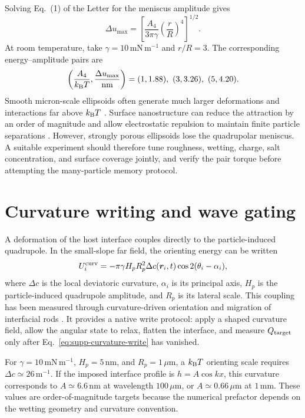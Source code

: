 \documentclass[aps,prl,onecolumn,superscriptaddress,nofootinbib]{revtex4-2}
\begin{document}
Solving Eq.~(1) of the Letter for the meniscus amplitude gives
\begin{equation}
 \Delta u_{\max}=
 \left[
 \frac{A_4}{3\pi\gamma}
 \left(\frac{r}{R}\right)^4
 \right]^{1/2}.
 \label{eq:supp-meniscus}
\end{equation}
At room temperature, take \(\gamma=10\,\mathrm{mN\,m^{-1}}\) and \(r/R=3\).
The corresponding energy--amplitude pairs are
\begin{equation}
 \left(\frac{A_4}{k_{\rm B}T},\frac{\Delta u_{\max}}{\mathrm{nm}}\right)
 =(1,1.88),\ (3,3.26),\ (5,4.20).
\end{equation}
Smooth
micron-scale ellipsoids often generate much larger deformations and
interactions far above \(k_{\rm B}T\) \cite{loudet2005}.  Surface
nanostructure can reduce the attraction by an order of magnitude and allow
electrostatic repulsion to maintain finite particle separations
\cite{trevenen2023}.  However, strongly porous ellipsoids lose the
quadrupolar meniscus.  A suitable experiment should therefore tune roughness,
wetting, charge, salt concentration, and surface coverage jointly, and verify
the pair torque before attempting the many-particle memory protocol.

\section{Curvature writing and wave gating}

A deformation of the host interface couples directly to the
particle-induced quadrupole.  In the small-slope far field, the orienting
energy can be written
\begin{equation}
 U_i^{\rm curv}=-\pi\gamma H_pR_p^2\Delta c(\bm r_i,t)
 \cos2(\theta_i-\alpha_i),
 \label{eq:supp-curvature-write}
\end{equation}
where \(\Delta c\) is the local deviatoric curvature, \(\alpha_i\) is its
principal axis, \(H_p\) is the particle-induced quadrupole amplitude, and
\(R_p\) is its lateral scale.  This coupling has been measured through
curvature-driven orientation and migration of interfacial rods
\cite{cavallaro2011}.  It provides a native write protocol: apply a shaped
curvature field, allow the angular state to relax, flatten the interface, and
measure \(Q_{\rm target}\) only after Eq.~\eqref{eq:supp-curvature-write}
has vanished.

For \(\gamma=10\,\mathrm{mN\,m^{-1}}\), \(H_p=5\,\mathrm{nm}\), and
\(R_p=1\,\mu\mathrm m\), a \(k_{\rm B}T\) orienting scale requires
\(\Delta c\simeq26\,\mathrm{m^{-1}}\).  If the imposed interface profile is
\(h=A\cos kx\), this curvature corresponds to
\(A\simeq6.6\,\mathrm{nm}\) at wavelength \(100\,\mu\mathrm m\), or
\(A\simeq0.66\,\mu\mathrm m\) at \(1\,\mathrm{mm}\).  These values are
order-of-magnitude targets because the numerical prefactor depends on the
wetting geometry and curvature convention.
\end{document}
